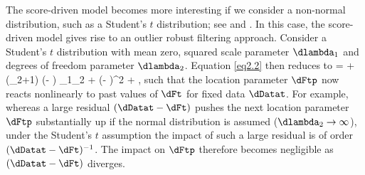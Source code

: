 The score-driven model becomes more interesting if we consider a non-normal distribution, such as a Student's $t$ distribution; see \citet{CKL2013} and \citet{harveyluati2014}. In this case, the score-driven model gives rise to an outlier robust filtering approach. Consider a Student's $t$ distribution with mean zero, squared scale parameter $\dlambda_1$ and degrees of freedom parameter $\dlambda_2$. Equation \eqref{eq2.2} then reduces to
    \dFtp = \domega + \dalpha\,
    (\dlambda_2+1) 
    \frac
    {(\dDatat - \dFt)}
    {\dlambda_1\dlambda_2 + (\dDatat - \dFt)^2}
    + \dbeta \dFt
    ,
\eq
such that the location parameter $\dFtp$ now reacts nonlinearly to past values of $\dFt$ for fixed data $\dDatat$. 
For example, whereas a large residual $(\dDatat-\dFt)$ pushes the next location parameter $\dFtp$ substantially up if the normal distribution is assumed ($\dlambda_2\to\infty$), under the Student's $t$ assumption the impact of such a large residual is of order $(\dDatat-\dFt)^{-1}$. The impact on $\dFtp$ therefore becomes negligible as $(\dDatat-\dFt)$ diverges.


